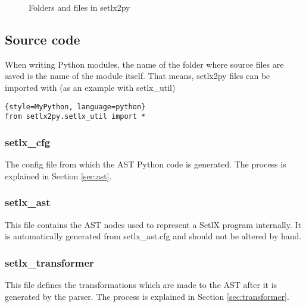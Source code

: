 \begin{figure}[ht]
\caption{Folders and files in setlx2py}
\end{figure}

%
%
\clearpage
\subsection{Source code}

When writing Python modules, the name of the folder where source files are saved is the name of the module itself. That means, setlx2py files can be imported with (as an example with setlx\_util)

\begin{lstlisting}{style=MyPython, language=python}
from setlx2py.setlx_util import *
\end{lstlisting}

%
\subsubsection{setlx\_cfg}

The config file from which the AST Python code is generated. The process is explained in Section \ref{sec:ast}.

%
\subsubsection{setlx\_ast}

This file contains the AST nodes used to represent a SetlX program internally. It is automatically generated from setlx\_ast.cfg and should not be altered by hand.

%
\subsubsection{setlx\_transformer}

This file defines the transformations which are made to the AST after it is generated by the parser. The process is explained in Section \ref{sec:transformer}.

